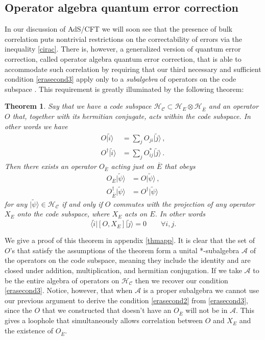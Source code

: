 \documentclass[11pt]{article}
\newcommand{\be}{\begin{equation}}
\newcommand{\ee}{\end{equation}}
\newcommand{\HC}{\mathcal{H}_{\mathcal{C}}}
\newcommand{\lan}{\langle}
\newcommand{\ran}{\rangle}
\newcommand{\wt}{\widetilde}
\newcommand{\ol}{\overline}
\newtheorem*{theorem}{Theorem}
\begin{document}
\subsection{Operator algebra quantum error correction}\label{opalgsec}
In our discussion of AdS/CFT we will soon see that the presence of bulk correlation puts nontrivial restrictions on the correctability of errors via the inequality \eqref{cirac}.  There is, however, a generalized version of quantum error correction, called operator algebra quantum error correction, that is able to accommodate such correlation by requiring that our third necessary and sufficient condition \eqref{erasecond3} apply only to a \textit{subalgebra} of operators on the code subspace \cite{beny2007generalization,beny2007quantum}.  This requirement is greatly illuminated by the following theorem:
\begin{theorem}
Say that we have a code subspace $\HC \subset \mathcal{H}_E \otimes \mathcal{H}_{\ol E}$ and an operator $O$ that, together with its hermitian conjugate, acts within the code subspace.  In other words we have
\begin{align}\nonumber
O|\wt{i}\ran&=\sum_j O_{ji}|\wt{j}\ran \,,\\
O^\dagger|\wt{i}\ran&=\sum_j O^*_{ij}|\wt{j}\ran \,.
\end{align}
Then there exists an operator $O_{\ol{E}}$ acting just on $\ol{E}$ that obeys
\begin{align}\nonumber
O_{\ol{E}}|\wt{\psi}\ran&=O|\wt{\psi}\ran \,,\\
O_{\ol{E}}^\dagger|\wt{\psi}\ran&=O^\dagger|\wt{\psi}\ran \label{opalg}
\end{align}
for any $|\wt{\psi}\ran\in \HC$ if and only if $O$ commutes with the projection of any operator $X_E$ onto the code subspace, where $X_E$ acts on $E$.  In other words
\be\label{commreq}
\lan\wt{i}|[O,X_E]|\wt{j}\ran=0  \qquad \forall i,j.
\ee
\end{theorem}
We give a proof of this theorem in appendix \ref{thmapp}.  It is clear that the set of $O$'s that satisfy the assumptions of the theorem form a unital *-subalgebra $\mathcal{A}$ of the operators on the code subspace, meaning they include the identity and are closed under addition, multiplication, and hermitian conjugation.   If we take $\mathcal{A}$ to be the entire algebra of operators on $\HC$ then we recover our condition \eqref{erasecond3}.  Notice, however, that when $\mathcal{A}$ is a proper subalgebra we cannot use our previous argument to derive the condition \eqref{erasecond2} from \eqref{erasecond3}, since the $O$ that we constructed that doesn't have an $O_{\ol{E}}$ will not be in $\mathcal{A}$.  This gives a loophole that simultaneously allows correlation between $O$ and $X_E$ and the existence of $O_{\ol{E}}$.  
\end{document}
